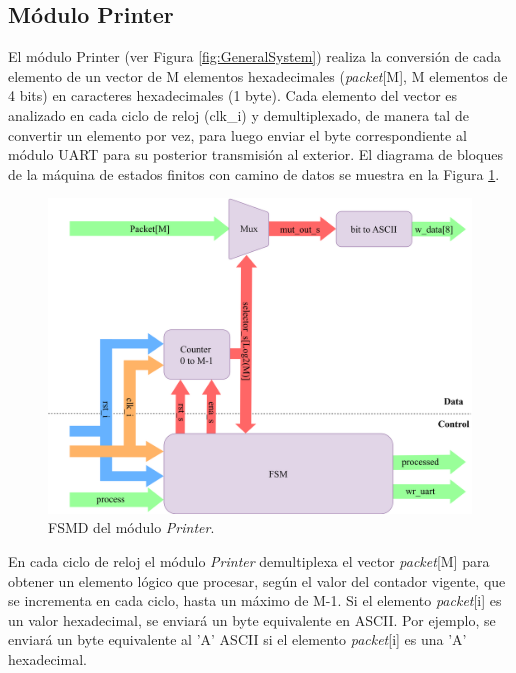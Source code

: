 \subsection{Módulo Printer}
	\label{sec:printer}
	
	El módulo Printer (ver Figura \ref{fig:GeneralSystem}) realiza la conversión de cada elemento de un vector de M elementos hexadecimales (\textit{packet}[M], M elementos de 4 bits) en caracteres hexadecimales (1 byte). Cada elemento del vector es analizado en cada ciclo de reloj (clk\_i) y demultiplexado, de manera tal de convertir un elemento por vez, para luego enviar el byte correspondiente al módulo UART para su posterior transmisión al exterior. El diagrama de bloques de la máquina de estados finitos con camino de datos se muestra en la Figura \ref{fig:Printer_module}.
	
	\begin{figure}[H]
		\centering
		\includegraphics[width=1\textwidth]{Figuras/Printer_module.png}
		\centering\caption{FSMD del módulo \textit{Printer}.}
		\label{fig:Printer_module}
	\end{figure}
	
	En cada ciclo de reloj el módulo \textit{Printer} demultiplexa el vector \textit{packet}[M] para obtener un elemento lógico que procesar, según el valor del contador vigente, que se incrementa en cada ciclo, hasta un máximo de M-1. Si el elemento \textit{packet}[i] es un valor hexadecimal, se enviará un byte equivalente en ASCII. Por ejemplo, se enviará un byte equivalente al 'A' ASCII si el elemento \textit{packet}[i] es una 'A' hexadecimal.
	
